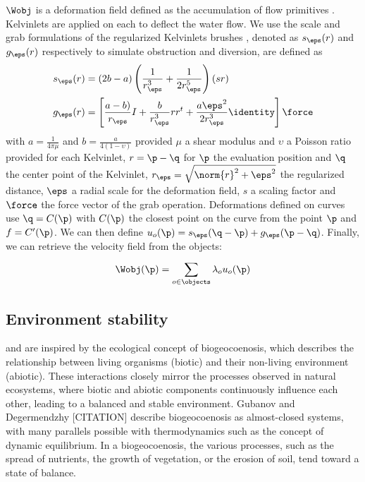 $\Wobj$ is a deformation field defined as the accumulation of flow primitives \cite{Wejchert1991}. Kelvinlets are applied on each  to deflect the water flow. We use the scale and grab formulations of the regularized Kelvinlets brushes \cite{DeGoes2017}, denoted as $s_\eps(r)$ and $g_\eps(r)$ respectively to simulate obstruction and diversion, are defined as
\begin{align*}
    s_\eps(r) &= (2b - a) \left (\frac{1}{r_\eps^3} + \frac{1}{2r_\eps^5} \right)(s r) \\
    g_\eps(r) &= \left[ \frac{a - b)}{r_\eps}I + \frac{b}{r_\eps^3} r r^t + 
\frac{a \eps^2}{2 r_\eps^3} \identity \right] \force
\end{align*}
with $a = \frac{1}{4 \pi \mu}$ and $b = \frac{a}{4 (1 - \upsilon)}$ provided $\mu$ a shear modulus and $\upsilon$ a Poisson ratio provided for each Kelvinlet, $r = \p - \q$ for $\p$ the evaluation position and $\q$ the center point of the Kelvinlet, $r_\eps = \sqrt{\norm{r}^2 + \eps^2}$ the regularized distance, $\eps$ a radial scale for the deformation field, $s$ a scaling factor and $\force$ the force vector of the grab operation.
Deformations defined on curves use $\q = C(\p)$ with $C(\p)$ the closest point on the curve from the point $\p$ and $f = C'(\p)$. We can then define $u_o(\p) = s_\eps(\q - \p) + g_\eps(\p - \q)$.
Finally, we can retrieve the velocity field from the objects:
\begin{align*}
    \Wobj(\p) = \sum_{o \in \objects}^{}{\lambda_o u_o(\p)}
\end{align*}


\subsection{Environment stability}
 and  are inspired by the ecological concept of biogeocoenosis, which describes the relationship between living organisms (biotic) and their non-living environment (abiotic). These interactions closely mirror the processes observed in natural ecosystems, where biotic and abiotic components continuously influence each other, leading to a balanced and stable environment. Gubanov and Degermendzhy [CITATION] describe biogeocoenosis as almost-closed systems, with many parallels possible with thermodynamics such as the concept of dynamic equilibrium. In a biogeocoenosis, the various processes, such as the spread of nutrients, the growth of vegetation, or the erosion of soil, tend toward a state of balance. 

